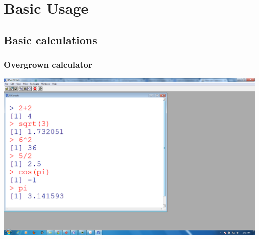 \documentclass[color=usenames,dvipsnames]{beamer}\usepackage[]{graphicx}\usepackage[]{color}
\begin{document}
\section{Basic Usage}





\subsection{Basic calculations}



\begin{frame}
  \frametitle{Overgrown calculator}
  \includegraphics[width=\textwidth]{figs/math-ops}
\end{frame}


%
%








\end{document}
